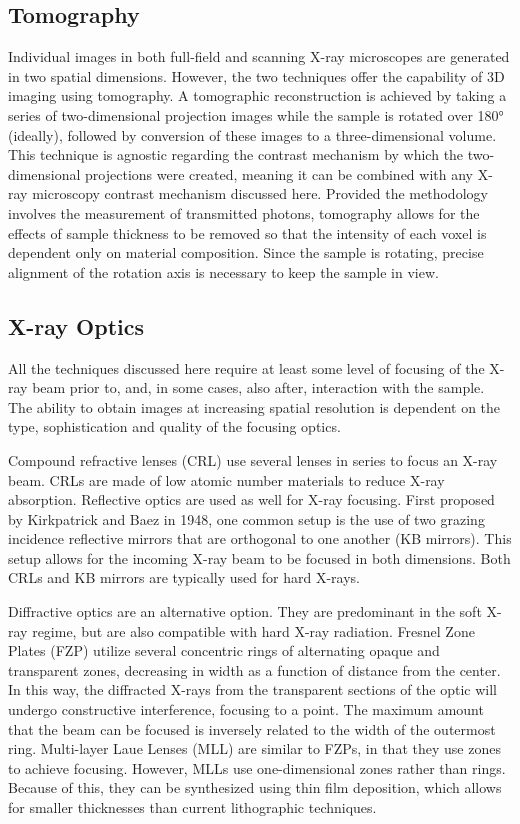 \documentclass[journal=cmatex,manuscript=perspective]{achemso}
\begin{document}
\subsection{Tomography}

Individual images in both full-field and scanning X-ray microscopes
are generated in two spatial dimensions. However, the two techniques
offer the capability of 3D imaging using tomography. A tomographic
reconstruction is achieved by taking a series of two-dimensional
projection images while the sample is rotated over \ang{180} (ideally), followed
by conversion of these images to a three-dimensional volume. This technique is
agnostic regarding the contrast mechanism by which the two-dimensional
projections were created, meaning it can be combined with any X-ray
microscopy contrast mechanism discussed here. Provided the methodology
involves the measurement of transmitted photons, tomography allows for
the effects of sample thickness to be removed so that the intensity of
each voxel is dependent only on material composition. Since the sample
is rotating, precise alignment of the rotation axis is necessary to
keep the sample in view.

\subsection{X-ray Optics}

All the techniques discussed here require at least some level of
focusing of the X-ray beam prior to, and, in some cases, also after,
interaction with the sample. The ability to obtain images at
increasing spatial resolution is dependent on the type, sophistication
and quality of the focusing optics.

Compound refractive lenses (CRL) use several lenses in series to focus an X-ray
beam. CRLs are made of low atomic number materials to reduce X-ray
absorption\cite{lengeler1996}. Reflective
optics are used as well for X-ray focusing. First proposed by Kirkpatrick and Baez in 1948, one common setup is the use of two grazing incidence reflective mirrors that are orthogonal to
one another (KB mirrors). This setup allows for the incoming X-ray beam to be
focused in both dimensions. Both CRLs
and KB mirrors are typically used for hard X-rays\cite{kirkpatrick1948}.

Diffractive optics are an alternative option. They are predominant in
the soft X-ray regime, but are also compatible with hard X-ray
radiation. Fresnel Zone Plates (FZP) utilize several concentric rings
of alternating opaque and transparent zones, decreasing in width as a function of distance from the center. In this way, the
diffracted X-rays from the transparent sections of the optic will
undergo constructive interference, focusing to a point. The maximum amount that the beam can be focused is inversely related to the width of the outermost ring.  Multi-layer Laue Lenses (MLL) are similar to
FZPs, in that they use zones to achieve focusing. However, MLLs use
one-dimensional zones rather than rings. Because of this, they can be
synthesized using thin film deposition, which allows for smaller
thicknesses than current lithographic
techniques\cite{synchrotronradiation,lblzoneplate}.
\end{document}
